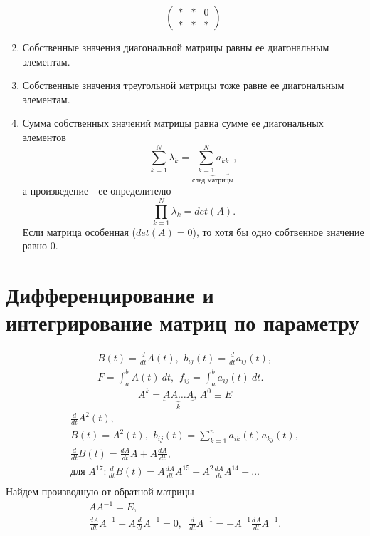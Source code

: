 \documentclass[a4paper,11pt]{article}
\begin{document}
\begin{enumerate}
\[\begin{pmatrix}
      * & * & 0 \\
      * & * & *
    \end{pmatrix}\]
  \item Собственные значения диагональной матрицы равны ее диагональным элементам.
  \item Собственные значения треугольной матрицы тоже равне ее диагональным элементам.
  \item Сумма собственных значений матрицы равна сумме ее диагональных элементов
    \[\sum_{k=1}^N \lambda_k = \underbrace{\sum_{k=1}^N a_{kk}}_{\text{след матрицы}},\]
    а произведение - ее определителю
    \[\prod_{k=1}^N \lambda_k = det(A).\]
    Если матрица особенная ($det(A)=0$), то хотя бы одно собтвенное значение равно $0$.
\end{enumerate}

\section{Дифференцирование и интегрирование матриц по параметру}
\begin{gather*}
  B(t) = \frac{d}{dt}A(t), \hspace{5pt} b_{ij}(t)=\frac{d}{dt}a_{ij}(t), \\
  F = \int_a^b A(t)\ dt, \hspace{5pt} f_{ij} = \int_a^b a_{ij}(t)\ dt.
\end{gather*}
\newpage
\marginpar
{
  \vspace{4mm}
  \footnotesize \[A^k = \underbrace{AA\dots A}_{k}, \hspace{2pt} A^0 \equiv E\]
}
\begin{gather*}
  \frac{d}{dt}A^2(t), \\
  B(t) = A^2(t), \hspace{5pt} b_{ij}(t) = \sum_{k=1}^n a_{ik}(t)a_{kj}(t), \\
  \frac{d}{dt}B(t) = \frac{dA}{dt}A + A\frac{dA}{dt}, \\
  \text{для } A^{17}: \frac{d}{dt}B(t) = A\frac{dA}{dt}A^{15} + A^2\frac{dA}{dt}A^{14} +\dots \\
\end{gather*}
Найдем производную от обратной матрицы
\begin{gather*}
  AA^{-1}=E, \\
  \frac{dA}{dt}A^{-1} + A\frac{d}{dt}A^{-1} = 0, \hspace{7pt}
  \frac{d}{dt}A^{-1} = - A^{-1}\frac{dA}{dt}A^{-1}.
\end{gather*}
\end{document}
